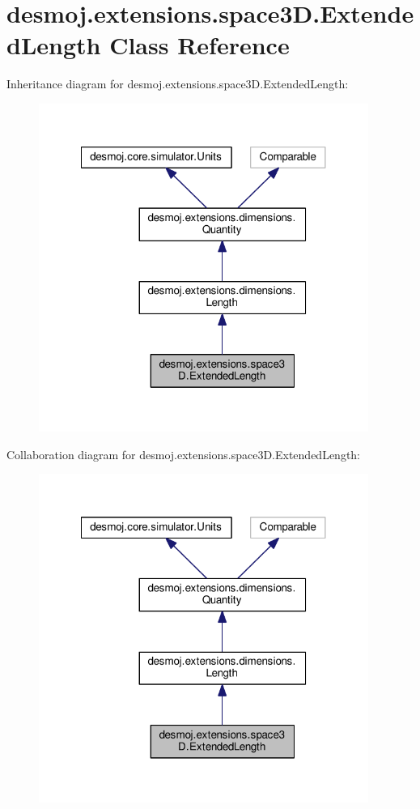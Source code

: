 \section{desmoj.\-extensions.\-space3\-D.\-Extended\-Length Class Reference}
\label{classdesmoj_1_1extensions_1_1space3_d_1_1_extended_length}


Inheritance diagram for desmoj.\-extensions.\-space3\-D.\-Extended\-Length\-:
\nopagebreak
\begin{figure}[H]
\begin{center}
\leavevmode
\includegraphics[width=305pt]{classdesmoj_1_1extensions_1_1space3_d_1_1_extended_length__inherit__graph}
\end{center}
\end{figure}


Collaboration diagram for desmoj.\-extensions.\-space3\-D.\-Extended\-Length\-:
\nopagebreak
\begin{figure}[H]
\begin{center}
\leavevmode
\includegraphics[width=305pt]{classdesmoj_1_1extensions_1_1space3_d_1_1_extended_length__coll__graph}
\end{center}
\end{figure}
